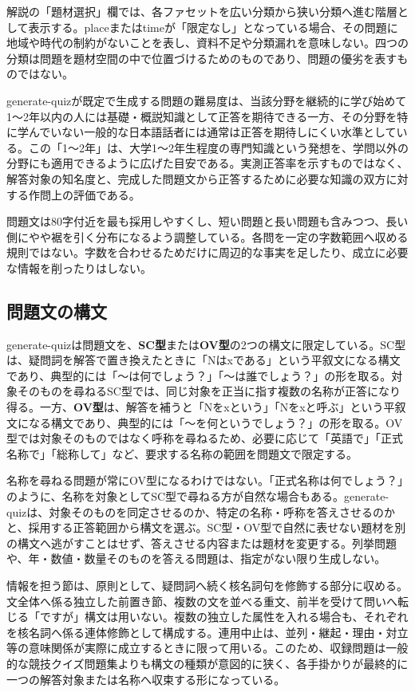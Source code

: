 解説の「題材選択」欄では、各ファセットを広い分類から狭い分類へ進む階層として表示する。placeまたはtimeが「限定なし」となっている場合、その問題に地域や時代の制約がないことを表し、資料不足や分類漏れを意味しない。四つの分類は問題を題材空間の中で位置づけるためのものであり、問題の優劣を表すものではない。

generate-quizが既定で生成する問題の難易度は、当該分野を継続的に学び始めて1～2年以内の人には基礎・概説知識として正答を期待できる一方、その分野を特に学んでいない一般的な日本語話者には通常は正答を期待しにくい水準としている。この「1～2年」は、大学1～2年生程度の専門知識という発想を、学問以外の分野にも適用できるように広げた目安である。実測正答率を示すものではなく、解答対象の知名度と、完成した問題文から正答するために必要な知識の双方に対する作問上の評価である。

問題文は80字付近を最も採用しやすくし、短い問題と長い問題も含みつつ、長い側にやや裾を引く分布になるよう調整している。各問を一定の字数範囲へ収める規則ではない。字数を合わせるためだけに周辺的な事実を足したり、成立に必要な情報を削ったりはしない。

\subsection*{問題文の構文}

generate-quizは問題文を、\textbf{SC型}または\textbf{OV型}の2つの構文に限定している。SC型は、疑問詞を解答で置き換えたときに「Nはxである」という平叙文になる構文であり、典型的には「～は何でしょう？」「～は誰でしょう？」の形を取る。対象そのものを尋ねるSC型では、同じ対象を正当に指す複数の名称が正答になり得る。一方、\textbf{OV型}は、解答を補うと「Nをxという」「Nをxと呼ぶ」という平叙文になる構文であり、典型的には「～を何というでしょう？」の形を取る。OV型では対象そのものではなく呼称を尋ねるため、必要に応じて「英語で」「正式名称で」「総称して」など、要求する名称の範囲を問題文で限定する。

名称を尋ねる問題が常にOV型になるわけではない。「正式名称は何でしょう？」のように、名称を対象としてSC型で尋ねる方が自然な場合もある。generate-quizは、対象そのものを同定させるのか、特定の名称・呼称を答えさせるのかと、採用する正答範囲から構文を選ぶ。SC型・OV型で自然に表せない題材を別の構文へ逃がすことはせず、答えさせる内容または題材を変更する。列挙問題や、年・数値・数量そのものを答える問題は、指定がない限り生成しない。

情報を担う節は、原則として、疑問詞へ続く核名詞句を修飾する部分に収める。文全体へ係る独立した前置き節、複数の文を並べる重文、前半を受けて問いへ転じる「ですが」構文は用いない。複数の独立した属性を入れる場合も、それぞれを核名詞へ係る連体修飾として構成する。連用中止は、並列・継起・理由・対立等の意味関係が実際に成立するときに限って用いる。このため、収録問題は一般的な競技クイズ問題集よりも構文の種類が意図的に狭く、各手掛かりが最終的に一つの解答対象または名称へ収束する形になっている。

